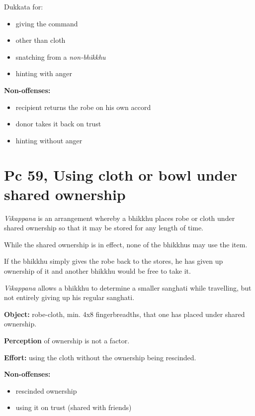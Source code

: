 Dukkata for:

\begin{itemize}
\tightlist
\item
  giving the command
\item
  other than cloth
\item
  snatching from a \emph{non-bhikkhu}
\item
  hinting with anger
\end{itemize}

\textbf{Non-offenses:}

\begin{itemize}
\tightlist
\item
  recipient returns the robe on his own accord
\item
  donor takes it back on trust
\item
  hinting without anger
\end{itemize}

\section{Pc 59, Using cloth or bowl under shared ownership}

\emph{Vikappana} is an arrangement whereby a bhikkhu places robe or
cloth under shared ownership so that it may be stored for any length of
time.

While the shared ownership is in effect, none of the bhikkhus may use
the item.

If the bhikkhu simply gives the robe back to the stores, he has given up
ownership of it and another bhikkhu would be free to take it.

\emph{Vikappana} allows a bhikkhu to determine a smaller sanghati while
travelling, but not entirely giving up his regular sanghati.

\textbf{Object:} robe-cloth, min. 4x8 fingerbreadths, that one has
placed under shared ownership.

\textbf{Perception} of ownership is not a factor.

\textbf{Effort:} using the cloth without the ownership being rescinded.

\textbf{Non-offenses:}

\begin{itemize}
\tightlist
\item
  rescinded ownership
\item
  using it on trust (shared with friends)
\end{itemize}

